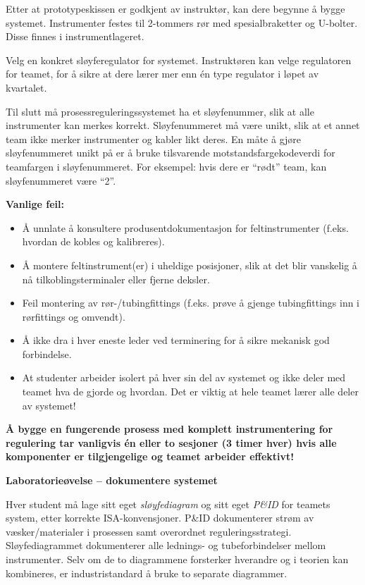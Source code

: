 Etter at prototypeskissen er godkjent av instruktør, kan dere begynne å bygge systemet. Instrumenter festes til 2-tommers rør med spesialbraketter og U-bolter. Disse finnes i instrumentlageret.

Velg en konkret sløyferegulator for systemet. Instruktøren kan velge regulatoren for teamet, for å sikre at dere lærer mer enn én type regulator i løpet av kvartalet.

Til slutt må prosessreguleringssystemet ha et sløyfenummer, slik at alle instrumenter kan merkes korrekt. Sløyfenummeret må være unikt, slik at et annet team ikke merker instrumenter og kabler likt deres. En måte å gjøre sløyfenummeret unikt på er å bruke tilsvarende motstandsfargekodeverdi for teamfargen i sløyfenummeret. For eksempel: hvis dere er ``rødt'' team, kan sløyfenummeret være ``2''.

\vskip 10pt

{\bf Vanlige feil:}

\begin{itemize}
\item{} Å unnlate å konsultere produsentdokumentasjon for feltinstrumenter (f.eks. hvordan de kobles og kalibreres).
\item{} Å montere feltinstrument(er) i uheldige posisjoner, slik at det blir vanskelig å nå tilkoblingsterminaler eller fjerne deksler.
\item{} Feil montering av rør-/tubingfittings (f.eks. prøve å gjenge tubingfittings inn i rørfittings og omvendt).
\item{} Å ikke dra i hver eneste leder ved terminering for å sikre mekanisk god forbindelse.
\item{} At studenter arbeider isolert på hver sin del av systemet og ikke deler med teamet hva de gjorde og hvordan. Det er viktig at hele teamet lærer alle deler av systemet!
\end{itemize}

\vskip 10pt

{\bf Å bygge en fungerende prosess med komplett instrumentering for regulering tar vanligvis én eller to sesjoner (3 timer hver) hvis alle komponenter er tilgjengelige og teamet arbeider effektivt!}




\vfil \eject

\noindent
{\bf Laboratorieøvelse -- dokumentere systemet}

\vskip 5pt

Hver student må lage sitt eget {\it sløyfediagram} og sitt eget {\it P\&ID} for teamets system, etter korrekte ISA-konvensjoner. P\&ID dokumenterer strøm av væsker/materialer i prosessen samt overordnet reguleringsstrategi. Sløyfediagrammet dokumenterer alle lednings- og tubeforbindelser mellom instrumenter. Selv om de to diagrammene forsterker hverandre og i teorien kan kombineres, er industristandard å bruke to separate diagrammer.

